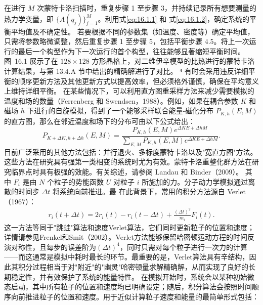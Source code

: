 在进行 \(M\) 次蒙特卡洛扫描时，重复步骤 1 至步骤 3，并持续记录所有想要测量的热力学变量，即 \(\{A(q_j)\}_{j=1}^M\)。利用式\autoref{eq:16.1.1} 和 式\autoref{eq:16.1.2}，确定系统的平衡平均值及不确定性。
若要根据不同的参数集（如温度、密度等）确定平均值，只需将参数略微调整，然后重复步骤 1 至步骤 5，包括平衡步骤 4.5。将上一次运行的最后一个构型作为下一次运行的首个构型，往往能够显著缩短平衡时间。图~16.1 展示了在 \(128 \times 128\) 方形晶格上，对二维伊辛模型的比热进行的蒙特卡洛计算结果，与第 13.4.A 节中给出的精确解进行了对比。
⁴ 有时会采用违反详细平衡的顺序更新方法及其他更新方式以提高效率，但必须格外谨慎，确保在平均意义上维持详细平衡。
在某些情况下，可以利用直方图重采样方法来减少需要模拟的温度和场的数量（Ferrenberg 和 Swendsen，1988）。例如，如果在耦合参数 \(K\) 和磁场 \(h\) 下进行的自旋模拟，得到了一个能够采样联合能量-磁化分布 \(P_{K,h}(E,M)\) 的直方图，那么在邻近温度和场下的分布可由以下公式给出：
\begin{equation}\tag{16.2.9}\label{eq:16.2.9}
P _ { K + \Delta K , h + \Delta h } ( E , M ) = \frac { P _ { K , h } ( E , M ) e ^{\Delta K E + \Delta h M} } { \sum _ { E , M } P _ { K , h } ( E , M ) e ^{\Delta K E + \Delta h M} } .
\end{equation}
目前广泛采用的其他方法包括：并行退火、多标度蒙特卡洛以及"宽直方图"方法。这些方法在研究具有强第一类相变的系统时尤为有效。蒙特卡洛重整化群方法在研究临界点时具有极强的效能。有关综述，请参阅 Landau 和 Binder（2009）。
其中 \(F_{i}\) 是由 \(N\) 个粒子的势能函数 \(U\) 对粒子 \(i\) 所施加的力。分子动力学模拟通过离散的时间步 \(\Delta t\) 将系统向前推进。最
在此背景下，常用的积分方法源自 Verlet（1967）：
\begin{equation}\tag{16.2.10}\label{eq:16.2.10}
\begin{array}{r} { r _ { i } ( t + \Delta t ) = 2 r _ { i } ( t ) - r _ { i } ( t - \Delta t ) + \frac { ( \Delta t ) ^{2} } { m _ { i } } F _ { i } ( t ) . } \end{array}
\end{equation}
这一方法等同于"跳蛙"算法和速度Verlet算法，它们同时更新粒子的位置和速度；详情请参见Frenkel和Smit（2002）。Verlet方法能够保留哈密顿运动方程的时间反演对称性，且每步的误差阶为\((\Delta t)^4\)，同时只需对每个粒子进行一次力的计算——而这通常是模拟中耗时最长的环节。最重要的是，Verlet算法具有辛结构，因此其积分过程相当于对"附近"的"幽灵"哈密顿量求解精确解，从而实现了良好的长期稳定性，并有效保护了系统的能量特性。
在模拟开始时，系统会以某种初始微态启动，其中所有粒子的位置和速度均已明确设定；随后，积分算法会按照时间顺序向前推进粒子的位置和速度。用于近似计算粒子速度和能量的最简单形式包括：
